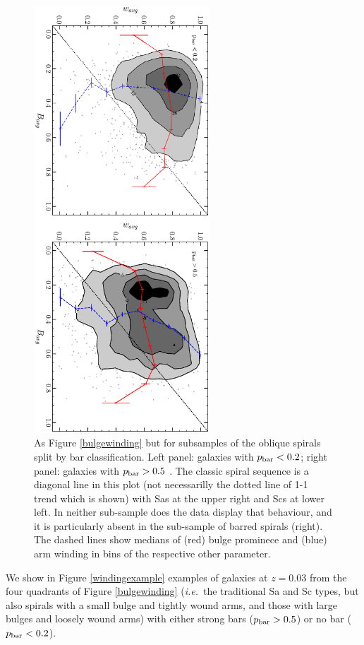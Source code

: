 \documentclass[usenatbib]{mn2e}
\newcommand{\ie}{{\it i.e.}}
\begin{document}
\begin{figure}
\includegraphics[height=160mm,angle=90]{Figure6.ps}
\caption{As Figure \ref{bulgewinding} but for subsamples of the oblique spirals split by bar classification.  Left panel: galaxies with $p_{\rm bar} < 0.2$; right panel: galaxies with $p_{\rm bar} > 0.5$ \label{bars}. The classic spiral sequence is a diagonal line in this plot (not necessarilly the dotted line of 1-1 trend which is shown) with Sas at the upper right and Scs at lower left. In neither sub-sample does the data display that behaviour, and it is particularly absent in the sub-sample of barred spirals (right). The dashed lines show medians of (red) bulge prominece and (blue) arm winding in bins of the respective other parameter.  }
\end{figure}

 We show in Figure \ref{windingexample} examples of galaxies at $z=0.03$ from the four quadrants of Figure \ref{bulgewinding} (\ie ~the traditional Sa and Sc types, but also spirals with a small bulge and tightly wound arms, and those with large bulges and loosely wound arms) with either strong bars ($p_{\rm bar}>0.5$) or no bar ($p_{\rm bar} < 0.2$). 
 
\end{document}
